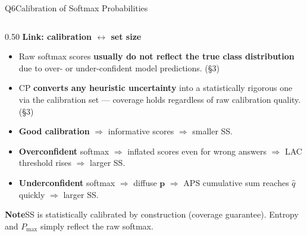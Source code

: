 \documentclass[aspectratio=169,10pt]{beamer}
\newcommand{\hruleslide}{%
  \vspace{0.15em}{\color{Rule}\hrule height 0.4pt}\vspace{0.3em}}
\newcommand{\notebox}[2]{%
  \begin{tcolorbox}[colback=#1!5,colframe=#1!80,boxrule=0.5pt,arc=2pt,left=2pt,right=2pt,top=2pt,bottom=2pt]
    \footnotesize\textcolor{#1!80!black}{\bfseries Note}\enspace #2
  \end{tcolorbox}}
\begin{document}
\begin{frame}{Q6\enspace Calibration of Softmax Probabilities}
\begin{columns}[T]
  \begin{column}{0.50\textwidth}
    {\small\bfseries\color{darkred}Link: calibration $\leftrightarrow$ set size}
    \hruleslide
    \begin{itemize}\setlength\itemsep{5pt}\footnotesize
      \item Raw softmax scores \textbf{usually do not reflect the true class distribution} due to over- or under-confident model predictions. (§3)
      \item CP \textbf{converts any heuristic uncertainty} into a statistically rigorous one via the calibration set — coverage holds regardless of raw calibration quality. (§3)
      \item \textbf{Good calibration} $\Rightarrow$ informative scores $\Rightarrow$ smaller SS.
      \item \textbf{Overconfident} softmax $\Rightarrow$ inflated scores even for wrong answers $\Rightarrow$ LAC threshold rises $\Rightarrow$ larger SS.
      \item \textbf{Underconfident} softmax $\Rightarrow$ diffuse $\mathbf{p}$ $\Rightarrow$ APS cumulative sum reaches $\hat{q}$ quickly $\Rightarrow$ larger SS.
    \end{itemize}

    \vspace{0.4em}
    \notebox{GreenOk}{SS is statistically calibrated by construction (coverage guarantee). Entropy and $P_{\max}$ simply reflect the raw softmax.}
  \end{column}
\end{columns}
\end{frame}
\end{document}
